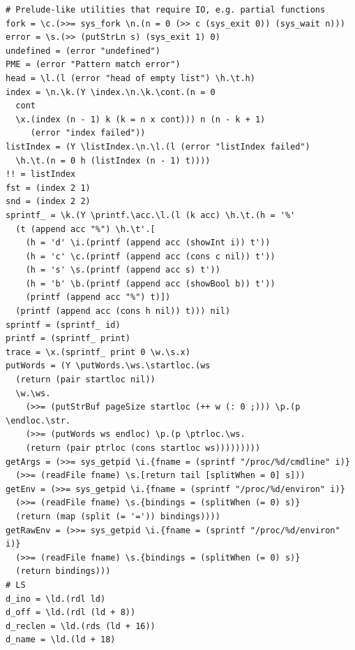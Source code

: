 \begin{verbatim}
# Prelude-like utilities that require IO, e.g. partial functions
fork = \c.(>>= sys_fork \n.(n = 0 (>> c (sys_exit 0)) (sys_wait n)))
error = \s.(>> (putStrLn s) (sys_exit 1) 0)
undefined = (error "undefined")
PME = (error "Pattern match error")
head = \l.(l (error "head of empty list") \h.\t.h)
index = \n.\k.(Y \index.\n.\k.\cont.(n = 0
  cont
  \x.(index (n - 1) k (k = n x cont))) n (n - k + 1) 
     (error "index failed"))
listIndex = (Y \listIndex.\n.\l.(l (error "listIndex failed") 
  \h.\t.(n = 0 h (listIndex (n - 1) t))))
!! = listIndex
fst = (index 2 1)
snd = (index 2 2)
sprintf_ = \k.(Y \printf.\acc.\l.(l (k acc) \h.\t.(h = '%'
  (t (append acc "%") \h.\t'.[
    (h = 'd' \i.(printf (append acc (showInt i)) t'))
    (h = 'c' \c.(printf (append acc (cons c nil)) t'))
    (h = 's' \s.(printf (append acc s) t'))
    (h = 'b' \b.(printf (append acc (showBool b)) t'))
    (printf (append acc "%") t)])
  (printf (append acc (cons h nil)) t))) nil)
sprintf = (sprintf_ id)
printf = (sprintf_ print)
trace = \x.(sprintf_ print 0 \w.\s.x)
putWords = (Y \putWords.\ws.\startloc.(ws
  (return (pair startloc nil))
  \w.\ws.
    (>>= (putStrBuf pageSize startloc (++ w (: 0 ;))) \p.(p \endloc.\str.
    (>>= (putWords ws endloc) \p.(p \ptrloc.\ws.
    (return (pair ptrloc (cons startloc ws)))))))))
getArgs = (>>= sys_getpid \i.{fname = (sprintf "/proc/%d/cmdline" i)}
  (>>= (readFile fname) \s.[return tail [splitWhen = 0] s]))
getEnv = (>>= sys_getpid \i.{fname = (sprintf "/proc/%d/environ" i)}
  (>>= (readFile fname) \s.{bindings = (splitWhen (= 0) s)}
  (return (map (split (= '=')) bindings))))
getRawEnv = (>>= sys_getpid \i.{fname = (sprintf "/proc/%d/environ" i)}
  (>>= (readFile fname) \s.{bindings = (splitWhen (= 0) s)}
  (return bindings)))
# LS 
d_ino = \ld.(rdl ld)
d_off = \ld.(rdl (ld + 8))
d_reclen = \ld.(rds (ld + 16))
d_name = \ld.(ld + 18)


\end{verbatim}
